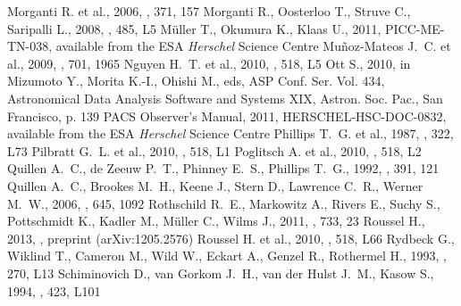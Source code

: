 \begin{thebibliography}{}
 Morganti R. et al., 2006, \mnras, 371, 157
 Morganti R., Oosterloo T., Struve C., Saripalli L., 2008, \aap, 485, L5
 M{\"u}ller T., Okumura K., Klaas U., 2011, PICC-ME-TN-038, available from the ESA \emph{Herschel} Science Centre
 Mu{\~n}oz-Mateos J.~C. et al., 2009, \apj, 701, 1965
 Nguyen H.~T. et al., 2010, \aap, 518, L5
 Ott S., 2010, in Mizumoto Y., Morita K.-I., Ohishi M., eds, ASP Conf. Ser. Vol. 434, Astronomical Data Analysis Software and Systems XIX, Astron. Soc. Pac., San Francisco, p. 139
 PACS Observer's Manual, 2011, HERSCHEL-HSC-DOC-0832, available from the ESA \emph{Herschel} Science Centre
 Phillips T.~G. et al., 1987, \apj, 322, L73
 Pilbratt G.~L. et al., 2010, \aap, 518, L1
 Poglitsch A. et al., 2010, \aap, 518, L2
 Quillen A.~C., de Zeeuw P.~T., Phinney E.~S., Phillips T.~G., 1992, \apj, 391, 121
 Quillen A.~C., Brookes M.~H., Keene J., Stern D., Lawrence C.~R., Werner M.~W., 2006, \apj, 645, 1092
 Rothschild R.~E., Markowitz A., Rivers E., Suchy S., Pottschmidt K., Kadler M., M{\"u}ller C., Wilms J., 2011, \apj, 733, 23
 Roussel H., 2013, \pasp, preprint (arXiv:1205.2576)
 Roussel H. et al., 2010, \aap, 518, L66
 Rydbeck G., Wiklind T., Cameron M., Wild W., Eckart A., Genzel R., Rothermel H., 1993, \aap, 270, L13
 Schiminovich D., van Gorkom J.~H., van der Hulst J.~M., Kasow S., 1994, \apjl, 423, L101

\end{thebibliography}
